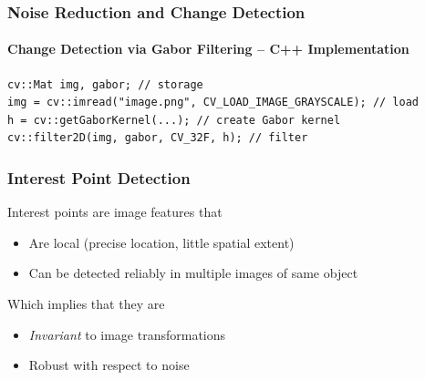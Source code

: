\documentclass[xetex,professionalfont]{beamer}
\begin{document}

\begin{frame}[fragile]
\frametitle{Noise Reduction and Change Detection}
\framesubtitle{Change Detection via Gabor Filtering -- C++ Implementation}


\begin{verbatim}
cv::Mat img, gabor; // storage
img = cv::imread("image.png", CV_LOAD_IMAGE_GRAYSCALE); // load
h = cv::getGaborKernel(...); // create Gabor kernel
cv::filter2D(img, gabor, CV_32F, h); // filter

\end{verbatim}

\end{frame}


\begin{frame}
\frametitle{Interest Point Detection}

Interest points are image features that
\begin{itemize}
	\item Are local (precise location, little spatial extent) %
	\item Can be detected reliably in multiple images of same object %
\end{itemize} %

\bigskip
Which implies that they are
\begin{itemize}
	\item \emph{Invariant} to image transformations
	\item Robust with respect to noise
\end{itemize}

\end{frame}

\end{document}
